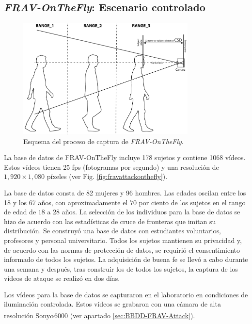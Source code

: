 \subsection{\textit{FRAV-OnTheFly}: Escenario controlado}\label{subsec:BBDD-FRAV-OnTheFly}

\begin{figure}[ht]
     \centering
     \includegraphics[width=0.8\textwidth]{ch-sistemasABC/images/ch-BBDDs/CAPTURA_ONTHEFLY.png}
     \caption{Esquema del proceso de captura de \textit{FRAV-OnTheFly}.}
     \label{fig:EsquemaCapturaFRAVABCOmTheFly}
\end{figure}

La base de datos de \Gls{FRAV-OnTheFly} incluye 178 sujetos y contiene 1068 vídeos. Estos vídeos tienen 25 fps (fotogramas por segundo) y una resolución de $1,920\times1,080$ píxeles (ver Fig. \ref{fig:fravattackonthefly}).

La base de datos consta de 82 mujeres y 96 hombres. Las edades oscilan entre los 18 y los 67 años, con aproximadamente el $70$ por ciento de los sujetos en el rango de edad de $18$ a $28$ años. La selección de los individuos para la base de datos se hizo de acuerdo con las estadísticas de cruce de fronteras que imitan su distribución. Se construyó una base de datos con estudiantes voluntarios, profesores y personal universitario. Todos los sujetos mantienen su privacidad y, de acuerdo con las normas de protección de datos, se requirió el consentimiento informado de todos los sujetos. La adquisición de buena fe se llevó a cabo durante una semana y después, tras construir los  de todos los sujetos, la captura de los vídeos de ataque se realizó en dos días. 

Los vídeos para la base de datos se capturaron en el laboratorio en condiciones de iluminación controlada. Estos vídeos se grabaron con una cámara de alta resolución Sony\textsuperscript{\textregistered}$\alpha6000$ (ver apartado \ref{sec:BBDD-FRAV-Attack}). 

